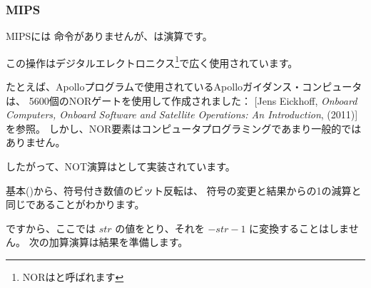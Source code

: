 ﻿\subsubsection{MIPS}




MIPSには \NOT 命令がありませんが、\NOR は演算です。

この操作はデジタルエレクトロニクス\footnote{NORはと呼ばれます}で広く使用されています。 

たとえば、Apolloプログラムで使用されているApolloガイダンス・コンピュータは、
5600個のNORゲートを使用して作成されました：
[Jens Eickhoff, \emph{Onboard Computers, Onboard Software and Satellite Operations: An Introduction}, (2011)]を参照。
しかし、NOR要素はコンピュータプログラミングであまり一般的ではありません。

したがって、NOT演算はとして実装されています。

基本()から、符号付き数値のビット反転は、
符号の変更と結果からの1の減算と同じであることがわかります。

ですから、ここでは $str$ の値をとり、それを $-str-1$ に変換することはしません。 
次の加算演算は結果を準備します。
